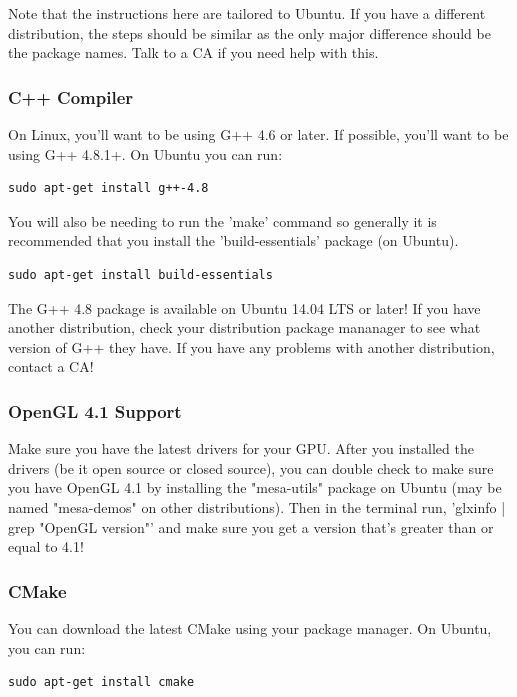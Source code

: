 \documentclass{article}
\begin{document}
Note that the instructions here are tailored to Ubuntu. If you have a different distribution, the steps should be similar as the only major difference should be the package names. Talk to a CA if you need help with this.

\subsubsection*{C++ Compiler}

On Linux, you'll want to be using G++ 4.6 or later. If possible, you'll want to be using G++ 4.8.1+. On Ubuntu you can run:

\begin{lstlisting}
sudo apt-get install g++-4.8
\end{lstlisting}

You will also be needing to run the 'make' command so generally it is recommended that you install the 'build-essentials' package (on Ubuntu).

\begin{lstlisting}
sudo apt-get install build-essentials
\end{lstlisting}

The G++ 4.8 package is available on Ubuntu 14.04 LTS or later! If you have another distribution, check your distribution package mananager to see what version of G++ they have. If you have any problems with another distribution, contact a CA!

\subsubsection*{OpenGL 4.1 Support}

Make sure you have the latest drivers for your GPU. After you installed the drivers (be it open source or closed source), you can double check to make sure you have OpenGL 4.1 by installing the "mesa-utils" package on Ubuntu (may be named "mesa-demos" on other distributions). Then in the terminal run, 'glxinfo | grep "OpenGL version"' and make sure you get a version that's greater than or equal to 4.1!

\subsubsection*{CMake}

You can download the latest CMake using your package manager. On Ubuntu, you can run:

\begin{lstlisting}
sudo apt-get install cmake
\end{lstlisting}
\end{document}
